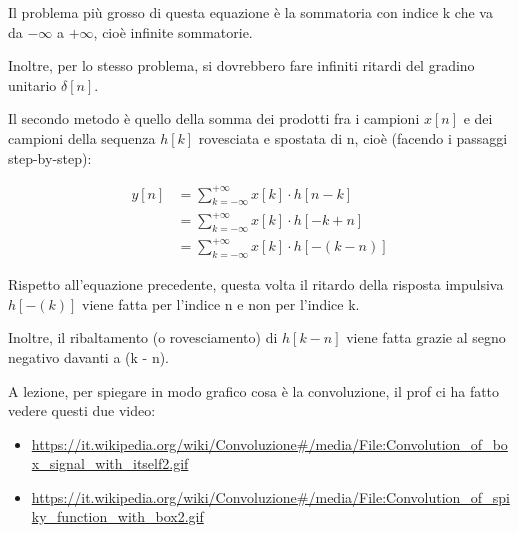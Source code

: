 \begin{tcolorbox}
    Il problema più grosso di questa equazione è la sommatoria con indice k che va da $- \infty$ a $+ \infty$, 
    cioè infinite sommatorie. \newline 

    Inoltre, per lo stesso problema, si dovrebbero fare infiniti ritardi del gradino unitario $\delta \left[ n\right]$. 
\end{tcolorbox}

Il secondo metodo è quello della somma dei prodotti fra i campioni $x \left[ n\right]$ e dei campioni della sequenza $h \left[ k\right]$ rovesciata e spostata di n, cioè (facendo i passaggi step-by-step): 

{
    \Large 
    \begin{equation}
        \begin{split}
        y \left[ n\right]
        &= 
        \sum_{k = - \infty}^{+ \infty}
        x \left[ k\right]
        \cdot 
        h \left[ n - k\right]
        \\
        &= 
        \sum_{k = - \infty}^{+ \infty}
        x \left[ k\right]
        \cdot 
        h \left[ - k + n\right]
        \\
        &=
        \sum_{k = - \infty}^{+ \infty}
        x \left[ k\right]
        \cdot 
        h \left[ - \left( k - n\right)\right]
        \end{split}
    \end{equation}
}

\begin{tcolorbox}
    Rispetto all'equazione precedente, questa volta il ritardo della risposta impulsiva $h \left[ - (k)\right]$ viene fatta per l'indice n e non per l'indice k. \newline 

    Inoltre, il ribaltamento (o rovesciamento) di $h \left[ k - n\right]$ viene fatta grazie al segno negativo davanti a (k - n). \newline 

    A lezione, per spiegare in modo grafico cosa è la convoluzione, il prof ci ha fatto vedere questi due video: 

    \begin{itemize}
        \item \url{https://it.wikipedia.org/wiki/Convoluzione#/media/File:Convolution_of_box_signal_with_itself2.gif} 
        \item \url{https://it.wikipedia.org/wiki/Convoluzione#/media/File:Convolution_of_spiky_function_with_box2.gif}
    \end{itemize}

\end{tcolorbox} 

